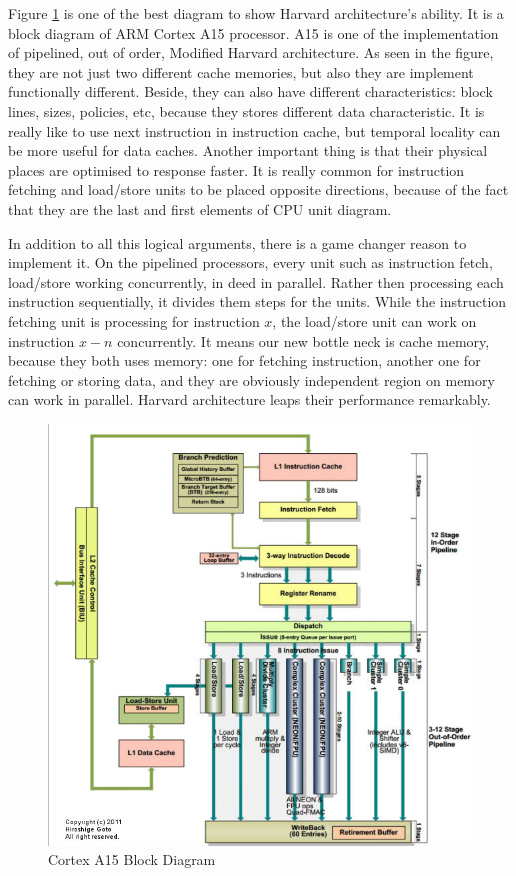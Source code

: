 	Figure \ref{fig:blockdiagram} is one of the best diagram to show Harvard architecture's ability. It is a block diagram of ARM Cortex A15 processor. A15 is one of the implementation of pipelined, out of order, Modified Harvard architecture\cite{sloss2004arm}. As seen in the figure, they are not just two different cache memories, but also they are implement functionally different. Beside, they can also have different characteristics: block lines, sizes, policies, etc\cite{Jim2007}, because they stores different data characteristic. It is really like to use next instruction in instruction cache, but temporal locality can be more useful for data caches. Another important thing is that their physical places are optimised to response faster. It is really common for instruction fetching and load/store units to be placed opposite directions, because of the fact that they are the last and first elements of CPU unit diagram. 

	In addition to all this logical arguments, there is a game changer reason to implement it. On the pipelined processors, every unit such as instruction fetch, load/store working concurrently, in deed in parallel. Rather then processing each instruction sequentially, it divides them steps for the units\cite{ComputerArchCoursera}. While the instruction fetching unit is processing for instruction $x$, the load/store unit can work on instruction $x-n$ concurrently. It means our new bottle neck is cache memory, because they both uses memory: one for fetching instruction, another one for fetching or storing data, and they are obviously independent region on memory can work in parallel. Harvard architecture leaps their performance remarkably. 
	\begin{figure}[h!]
		\centering
		\includegraphics[width=1\textwidth]{img/Cortex_A15_Block_Diagram.jpg}
		\caption{Cortex A15 Block Diagram}
		\label{fig:blockdiagram}
	\end{figure}


